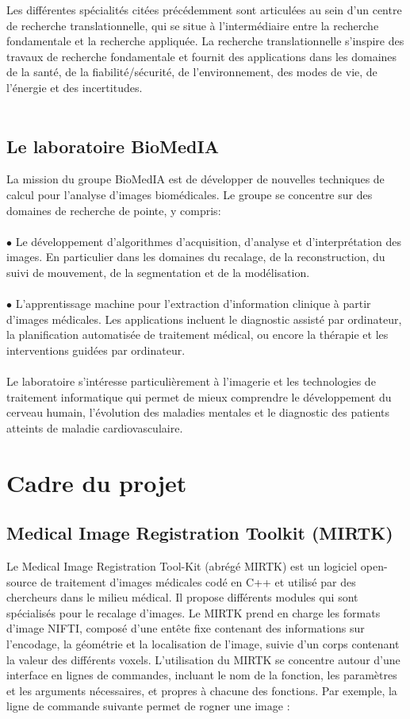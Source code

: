\documentclass[10pt]{report}
\begin{document}
	Les différentes spécialités citées précédemment sont articulées au sein d'un centre de recherche translationnelle, qui se situe à l'intermédiaire entre la recherche fondamentale et la recherche appliquée. La recherche translationnelle s'inspire des travaux de recherche fondamentale et fournit des applications dans les domaines de la santé, de la fiabilité/sécurité, de l'environnement, des modes de vie, de l'énergie et des incertitudes.
	\\
	\\
	\subsection{Le laboratoire BioMedIA}

	La mission du groupe BioMedIA est de développer de nouvelles techniques de
	calcul pour l'analyse d'images biomédicales. Le groupe se concentre sur des
	domaines de recherche de pointe, y compris:\\
	\\{$\bullet$} Le développement d'algorithmes d'acquisition, d'analyse et d'interprétation des images. En particulier dans les domaines du recalage, de la reconstruction,
	du suivi de mouvement, de la segmentation et de la modélisation. \\
	\\{$\bullet$} L'apprentissage machine pour l'extraction d'information clinique à partir
	d'images médicales. Les applications incluent le diagnostic assisté par
	ordinateur, la planification automatisée de traitement médical, ou encore la thérapie et les interventions guidées par ordinateur. \\
	\\Le laboratoire s'intéresse particulièrement à l'imagerie et les technologies de
	traitement informatique qui permet de mieux comprendre le
	développement du cerveau humain, l’évolution des maladies mentales et le
	diagnostic des patients atteints de maladie cardiovasculaire.
	
	\section{Cadre du projet} 
	\subsection{Medical Image Registration Toolkit (MIRTK)}
	Le Medical Image Registration Tool-Kit (abrégé MIRTK) est un logiciel open-source de traitement d'images médicales codé en C++ et utilisé par des chercheurs dans le milieu médical. Il propose différents modules qui sont spécialisés pour le recalage d'images. Le MIRTK prend en charge les formats d'image NIFTI, composé d'une entête fixe contenant des informations sur l'encodage, la géométrie et la localisation de l'image, suivie d'un corps contenant la valeur des différents voxels.   
	L'utilisation du MIRTK se concentre autour d'une interface en lignes de commandes, incluant le nom de la fonction, les paramètres et les arguments nécessaires, et propres à chacune des fonctions. Par exemple, la ligne de commande suivante permet de rogner une image :
	
\end{document}
